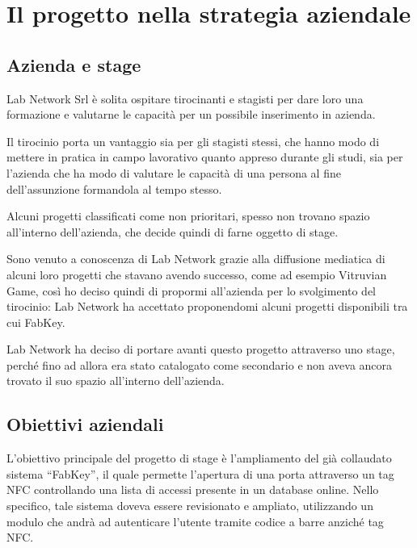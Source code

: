 
\chapter{Il progetto nella strategia aziendale}
\label{cap:processi-metodologie}

\section{Azienda e stage}
Lab Network Srl è solita ospitare tirocinanti e stagisti per dare loro una formazione e valutarne le capacità per un possibile inserimento in azienda.

Il tirocinio porta un vantaggio sia per gli stagisti stessi, che hanno modo di mettere in pratica in campo lavorativo quanto appreso durante gli studi, sia per l'azienda che ha modo di valutare le capacità di una persona al fine dell'assunzione formandola al tempo stesso. 

Alcuni progetti classificati come non prioritari, spesso non trovano spazio all'interno dell'azienda, che decide quindi di farne oggetto di stage.

Sono venuto a conoscenza di Lab Network grazie alla diffusione mediatica di alcuni loro progetti che stavano avendo successo, come ad esempio Vitruvian Game, così ho deciso quindi di propormi all'azienda per lo svolgimento del tirocinio: Lab Network ha accettato proponendomi alcuni progetti disponibili tra cui FabKey.

Lab Network ha deciso di portare avanti questo progetto attraverso uno stage, perché fino ad allora era stato catalogato come secondario e non aveva ancora trovato il suo spazio all'interno dell'azienda.

\section{Obiettivi aziendali}
L'obiettivo principale del progetto di stage è l'ampliamento del già collaudato sistema ``FabKey'', il quale permette l'apertura di una porta attraverso un tag NFC controllando una lista di accessi presente in un database online. Nello specifico, tale sistema doveva essere revisionato e ampliato, utilizzando un modulo che andrà ad autenticare l'utente tramite codice a barre anziché tag NFC.

